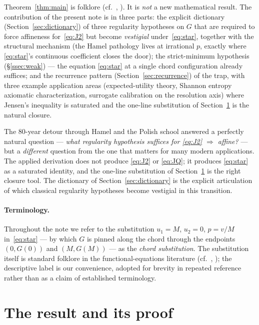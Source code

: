 \documentclass[review,12pt,a4paper]{elsarticle}
\theoremstyle{remark}
\begin{document}
Theorem~\ref{thm:main} is folklore (cf.~\cite[\S2.1]{Aczel1966},
\cite[Ch.~13]{Kuczma2009}). It is \emph{not} a new mathematical result.
The contribution of the present note is in three parts: the explicit
dictionary (Section~\ref{sec:dictionary}) of three regularity hypotheses
on $G$ that are required to force affineness for~\eqref{eq:J2} but become
\emph{vestigial} under~\eqref{eq:star}, together with the structural
mechanism (the Hamel pathology lives at irrational $p$, exactly where
\eqref{eq:star}'s continuous coefficient closes the door); the
strict-minimum hypothesis (\S\ref{ssec:weak}) --- the equation
\eqref{eq:star} at a single chord configuration already suffices; and the
recurrence pattern (Section~\ref{sec:recurrence}) of the trap, with three
example application areas (expected-utility theory, Shannon entropy
axiomatic characterization, surrogate calibration on the resolution axis)
where Jensen's inequality is saturated and the one-line substitution of
Section~\ref{sec:proof} is the natural closure.

The 80-year detour through Hamel and the Polish school answered a
perfectly natural question --- \emph{what regularity hypothesis suffices
for \eqref{eq:J2} $\Rightarrow$ affine?} --- but a \emph{different}
question from the one that matters for many modern applications. The
applied derivation does not produce \eqref{eq:J2} or \eqref{eq:JQ}; it
produces \eqref{eq:star} as a saturated identity, and the one-line
substitution of Section~\ref{sec:proof} is the right closure tool. The
dictionary of Section~\ref{sec:dictionary} is the explicit articulation
of which classical regularity hypotheses become vestigial in this
transition.

\paragraph{Terminology.} Throughout the note we refer to the substitution
$u_1 = M$, $u_2 = 0$, $p = v/M$ in~\eqref{eq:star} --- by which $G$ is
pinned along the chord through the endpoints $(0, G(0))$ and $(M, G(M))$
--- as the \emph{chord substitution}. The substitution itself is standard
folklore in the functional-equations literature
(cf.~\cite[\S2.1]{Aczel1966}, \cite[Ch.~13]{Kuczma2009}); the descriptive
label is our convenience, adopted for brevity in repeated reference rather
than as a claim of established terminology.

\section{The result and its proof}
\label{sec:proof}
\end{document}
